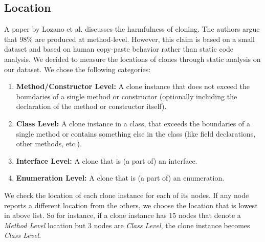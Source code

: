 \subsection{Location}\label{sec:setuplocation}
A paper by Lozano et al. \cite{lozano2007evaluating} discusses the harmfulness of cloning. The authors argue that 98\% are produced at method-level. However, this claim is based on a small dataset and based on human copy-paste behavior rather than static code analysis. We decided to measure the locations of clones through static analysis on our dataset. We chose the following categories:
\begin{enumerate}
  \item \textbf{Method/Constructor Level:} A clone instance that does not exceed the boundaries of a single method or constructor (optionally including the declaration of the method or constructor itself).
  \item \textbf{Class Level:} A clone instance in a class, that exceeds the boundaries of a single method or contains something else in the class (like field declarations, other methods, etc.).
  \item \textbf{Interface Level:} A clone that is (a part of) an interface.
  \item \textbf{Enumeration Level:} A clone that is (a part of) an enumeration.
\end{enumerate}
We check the location of each clone instance for each of its nodes. If any node reports a different location from the others, we choose the location that is lowest in above list. So for instance, if a clone instance has 15 nodes that denote a \textit{Method Level} location but 3 nodes are \textit{Class Level}, the clone instance becomes \textit{Class Level}.


